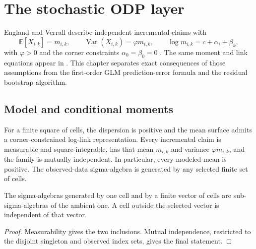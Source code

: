 
\chapter{The stochastic ODP layer}

England and Verrall describe independent incremental claims with
\[
  \mathbb{E}[X_{i,k}]=m_{i,k}, \qquad
  \operatorname{Var}(X_{i,k})=\varphi m_{i,k}, \qquad
  \log m_{i,k}=c+\alpha_i+\beta_k,
\]
with $\varphi>0$ and the corner constraints $\alpha_0=\beta_0=0$
\cite[Section 2, equations (2.5)--(2.7), p.~283]{EnglandVerrall1999}.
The same moment and link equations appear in
\cite[Section 2, equations (2.1)--(2.3)]{England2002}.
This chapter separates exact consequences of those assumptions from the first-order GLM
prediction-error formula and the residual bootstrap algorithm.

\section{Model and conditional moments}

\begin{definition}\label{def:odpStochasticModel}\leanok
For a finite square of cells, the dispersion is positive and the mean surface admits a
corner-constrained log-link representation. Every incremental claim is measurable and
square-integrable, has that mean $m_{i,k}$ and variance $\varphi m_{i,k}$, and the family is
mutually independent. In particular, every modeled mean is positive. The observed-data
sigma-algebra is generated by any selected finite set of cells.
\end{definition}

\begin{lemma}\label{lem:odpObservedIndep}\leanok
{}
The sigma-algebras generated by one cell and by a finite vector of cells are sub-sigma-algebras
of the ambient one. A cell outside the selected vector is independent of that vector.
\end{lemma}
\begin{proof}\leanok Measurability gives the two inclusions. Mutual independence, restricted to
the disjoint singleton and observed index sets, gives the final statement. \end{proof}

